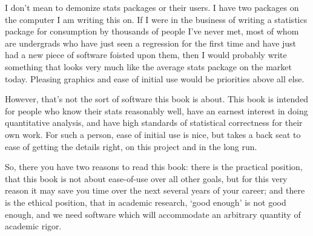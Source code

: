 {I don't mean to demonize stats packages or their users. I have two
packages on the computer I am writing this on. If I
were in the business of writing a statistics package for consumption by
thousands of people I've never met, most of whom are undergrads who have
just seen a regression for the first time and have just had a new piece
of software foisted upon them, then I would probably write something
that looks very much like the average stats package on the market today.
Pleasing graphics and ease of initial use would be priorities above all else.

However, that's not the sort of software this book is about.
This book is intended for people who know their stats reasonably well,
have an earnest interest in doing quantitative analysis, and have
high standards of statistical correctness for their own work. For such a
person, ease of initial use is nice, but takes a back seat to ease of
getting the details right, on this project and in the long run.

So, there you have two reasons to read this book: there is the practical
position, that this book is not about ease-of-use over all other goals,
but for this very reason it may save you time over the next several
years of your career; and there is the ethical position, that in academic
research, `good enough' is not good enough, and we need software which
will accommodate an arbitrary quantity of academic rigor.
}
